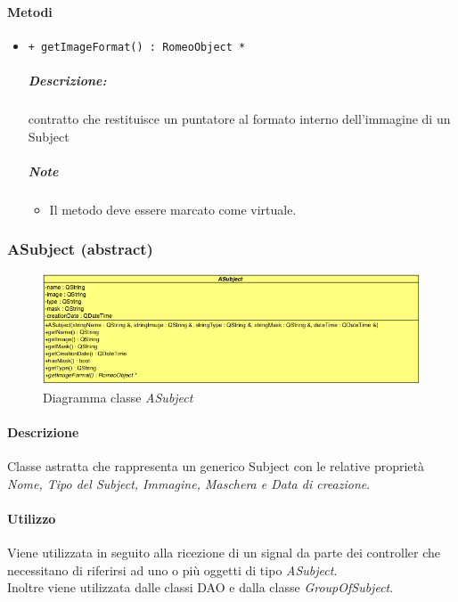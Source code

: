 \paragraph{\color{black}Metodi}
\begin{itemize}
			\item \color{blue} \verb!+ getImageFormat() : RomeoObject *!
			\color{black}
			\subparagraph{Descrizione:} contratto che restituisce un puntatore al formato interno dell'immagine di un Subject\g{}
			\subparagraph{Note}
			\begin{itemize}
				\item Il metodo deve essere marcato come virtuale.
			\end{itemize}
\end{itemize}
\pagebreak
\color{black}
\subsubsection{ASubject (abstract)}
\label{aSubject}
\begin{figure}[!h]
\centering
			\includegraphics[scale=0.80]{./Content/Immagini/modelCore/ASubject}
			\caption{Diagramma classe \textsl{ASubject}}
			\label{aSubject_img}
\end{figure}

\paragraph{Descrizione \\}
Classe astratta che rappresenta un generico Subject\g{} con le relative proprietà \emph{Nome, Tipo del Subject\g{}, Immagine, Maschera e Data di creazione}.

\paragraph{Utilizzo \\}
 Viene utilizzata in seguito alla ricezione di un signal\g{} da parte dei controller che necessitano di riferirsi ad uno o più oggetti di tipo \textsl{ASubject}.
 \\Inoltre viene utilizzata dalle classi DAO e dalla classe \textsl{GroupOfSubject}.
 
